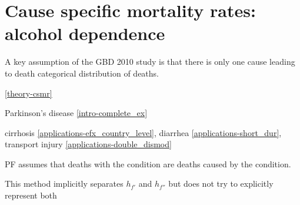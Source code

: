 \chapter{Cause specific mortality rates: alcohol dependence}
\label{applications-csmr}

A key assumption of the GBD 2010 study is that there is only one cause leading to death categorical distribution of deaths.


\ref{theory-csmr}

Parkinson's disease \ref{intro-complete_ex} 

cirrhosis \ref{applications-efx_country_level}, diarrhea \ref{applications-short_dur}, transport injury \ref{applications-double_dismod}

PF assumes that deaths with the condition are deaths caused by the condition.

This method implicitly separates $h_{f'}$ and $h_{f''}$ but does not try to explicitly represent both

